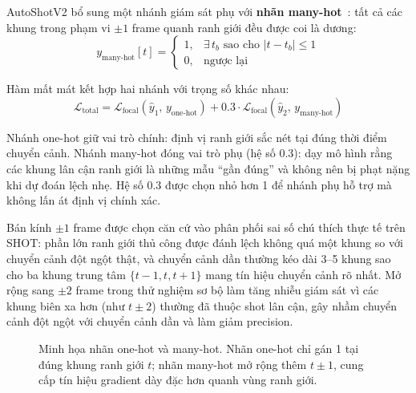 AutoShotV2 bổ sung một nhánh giám sát phụ với \textbf{nhãn many-hot}~\cite{Muller2019LabelSmoothing}: tất cả các khung trong phạm vi $\pm1$ frame quanh ranh giới đều được coi là dương:
\begin{equation}
    y_{\text{many-hot}}[t] =
    \begin{cases}
        1, & \exists\, t_b \text{ sao cho } |t - t_b| \le 1 \\
        0, & \text{ngược lại}
    \end{cases}
\end{equation}

Hàm mất mát kết hợp hai nhánh với trọng số khác nhau:
\begin{equation}
    \mathcal{L}_{\text{total}} = \mathcal{L}_{\text{focal}}(\hat{y}_1,\,y_{\text{one-hot}}) + 0.3\cdot\mathcal{L}_{\text{focal}}(\hat{y}_2,\,y_{\text{many-hot}})
    \label{eq:total_loss}
\end{equation}

Nhánh one-hot giữ vai trò chính: định vị ranh giới sắc nét tại đúng thời điểm chuyển cảnh. Nhánh many-hot đóng vai trò phụ (hệ số 0.3): dạy mô hình rằng các khung lân cận ranh giới là những mẫu ``gần đúng'' và không nên bị phạt nặng khi dự đoán lệch nhẹ. Hệ số 0.3 được chọn nhỏ hơn 1 để nhánh phụ hỗ trợ mà không lấn át định vị chính xác.

Bán kính $\pm 1$ frame được chọn căn cứ vào phân phối sai số chú thích thực tế trên SHOT: phần lớn ranh giới thủ công được đánh lệch không quá một khung so với chuyển cảnh đột ngột thật, và chuyển cảnh dần thường kéo dài 3--5 khung sao cho ba khung trung tâm $\{t-1, t, t+1\}$ mang tín hiệu chuyển cảnh rõ nhất. Mở rộng sang $\pm 2$ frame trong thử nghiệm sơ bộ làm tăng nhiễu giám sát vì các khung biên xa hơn (như $t \pm 2$) thường đã thuộc shot lân cận, gây nhầm chuyển cảnh đột ngột với chuyển cảnh dần và làm giảm precision.

\begin{figure}[H]
\centering
{}
\caption[Minh họa nhãn one-hot và many-hot]{Minh họa nhãn one-hot và many-hot. Nhãn one-hot chỉ gán 1 tại đúng khung ranh giới $t$; nhãn many-hot mở rộng thêm $t\pm1$, cung cấp tín hiệu gradient dày đặc hơn quanh vùng ranh giới.}
\label{fig:v2_onehot_manyhot}
\end{figure}
\FloatBarrier

